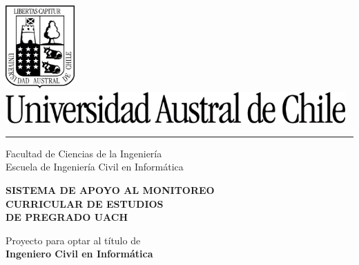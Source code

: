 \documentclass[12pt]{article}
\newcommand{\blockline}{\par\noindent\hspace{-0.05\textwidth}%
    \textcolor{black}{\rule{1.05\textwidth}{0.35mm}}\par\nobreak}
\begin{document}

\thispagestyle{empty}
\setcounter{page}{1}
\begin{spacing}{1.0}

\begin{center}
\includegraphics[width=2.65cm, height=3.18cm]{images/portada/escudo.png}\\
\vspace{0.5cm}
\includegraphics[width=13.02cm, height=1.23cm]{images/portada/uach.png}\\
\vspace{-0.4cm}
\blockline
\vspace{0.2cm}
{\fontsize{24}{24}\selectfont Facultad de Ciencias de la Ingeniería}\\[0.1cm]
{\fontsize{18}{18}\selectfont Escuela de Ingeniería Civil en Informática}\\
\end{center}

\vspace{2.0cm}

\begin{center}
	{\fontsize{18}{18}\selectfont \bf SISTEMA DE APOYO AL MONITOREO}\\[0.2cm]
	{\fontsize{18}{18}\selectfont \bf CURRICULAR DE ESTUDIOS}\\[0.2cm]
	{\fontsize{18}{18}\selectfont \bf DE PREGRADO UACH}\\[0.2cm]   
	
\end{center}

\vspace{2.0cm}

\begin{flushright} \small
{\fontsize{10}{10}\selectfont Proyecto para optar al título de}  \textcolor{white}{.}\\
{\fontsize{10}{10}\selectfont \bf Ingeniero Civil en Informática} 
\end{flushright}


\end{spacing}
\end{document}
